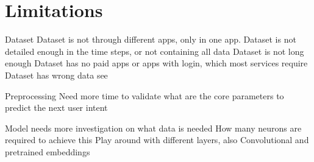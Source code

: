 
\section{Limitations}

Dataset
Dataset is not through different apps, only in one app.
Dataset is not detailed enough in the time steps, or not containing all data
Dataset is not long enough
Dataset has no paid apps or apps with login, which most services require
Dataset has wrong data see \cite{clay}

Preprocessing
Need more time to validate what are the core parameters to predict the next user intent


Model needs more investigation on what data is needed
How many neurons are required to achieve this
Play around with different layers, also Convolutional and pretrained embeddings


